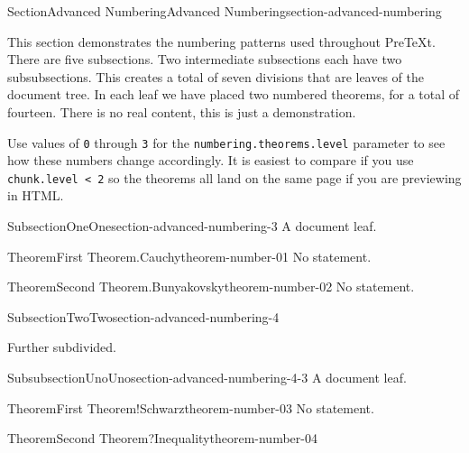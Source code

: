 \documentclass[twoside,10pt,]{article}
\newcommand{\mono}[1]{\texttt{#1}}
\numberwithin{equation}{section}
\begin{document}
\begin{sectionptx}{Section}{Advanced Numbering}{}{Advanced Numbering}{}{}{section-advanced-numbering}
\begin{introduction}{}%
This section demonstrates the numbering patterns used throughout PreTeXt.  There are five subsections.  Two intermediate subsections each have two subsubsections.  This creates a total of seven divisions that are leaves of the document tree.  In each leaf we have placed two numbered theorems, for a total of fourteen.  There is no real content, this is just a demonstration.%
\par
Use values of \mono{0} through \mono{3} for the \mono{numbering.theorems.level} parameter to see how these numbers change accordingly.  It is easiest to compare if you use \mono{chunk.level < 2} so the theorems all land on the same page if you are previewing in HTML.%
\end{introduction}%
%
%
\typeout{************************************************}
\typeout{************************************************}
%
\begin{subsectionptx}{Subsection}{One}{}{One}{}{}{section-advanced-numbering-3}
A document leaf.%
\begin{theorem}{Theorem}{First Theorem.}{Cauchy}{theorem-number-01}%
No statement.%
\end{theorem}
\begin{theorem}{Theorem}{Second Theorem.}{Bunyakovsky}{theorem-number-02}%
No statement.%
\end{theorem}
\end{subsectionptx}
%
%
\typeout{************************************************}
\typeout{************************************************}
%
\begin{subsectionptx}{Subsection}{Two}{}{Two}{}{}{section-advanced-numbering-4}
\begin{introduction}{}%
Further subdivided.%
\end{introduction}%
%
%
\typeout{************************************************}
\typeout{************************************************}
%
\begin{subsubsectionptx}{Subsubsection}{Uno}{}{Uno}{}{}{section-advanced-numbering-4-3}
A document leaf.%
\begin{theorem}{Theorem}{First Theorem!}{Schwarz}{theorem-number-03}%
No statement.%
\end{theorem}
\begin{theorem}{Theorem}{Second Theorem?}{Inequality}{theorem-number-04}%

\end{theorem}
\end{subsubsectionptx}
\end{subsectionptx}
\end{sectionptx}
\end{document}
